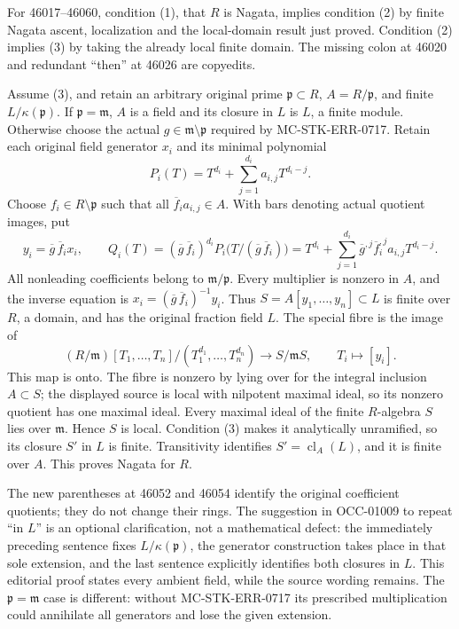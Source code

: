 For 46017--46060, condition (1), that \(R\) is Nagata, implies condition (2) by finite Nagata ascent, localization and the local-domain result just proved. Condition (2) implies (3) by taking the already local finite domain. The missing colon at 46020 and redundant ``then'' at 46026 are copyedits.

Assume (3), and retain an arbitrary original prime \(\mathfrak p\subset R\), \(A=R/\mathfrak p\), and finite \(L/\kappa(\mathfrak p)\). If \(\mathfrak p=\mathfrak m\), \(A\) is a field and its closure in \(L\) is \(L\), a finite module. Otherwise choose the actual \(g\in\mathfrak m\setminus\mathfrak p\) required by MC-\AlgebraIdentifierBreak{}STK-\AlgebraIdentifierBreak{}ERR-\AlgebraIdentifierBreak{}0717. Retain each original field generator \(x_i\) and its minimal polynomial \[
 P_i(T)=T^{d_i}+\sum_{j=1}^{d_i}a_{i,j}T^{d_i-j}.
\] Choose \(f_i\in R\setminus\mathfrak p\) such that all \(\overline f_i a_{i,j}\in A\). With bars denoting actual quotient images, put \[
 y_i=\overline g\,\overline f_i x_i,\qquad
 Q_i(T)=(\overline g\,\overline f_i)^{d_i}
 P_i\bigl(T/(\overline g\,\overline f_i)\bigr)
 =T^{d_i}+\sum_{j=1}^{d_i}
   \overline g^{,j}\overline f_i^{,j}a_{i,j}T^{d_i-j}.
\] All nonleading coefficients belong to \(\mathfrak m/\mathfrak p\). Every multiplier is nonzero in \(A\), and the inverse equation is \(x_i=(\overline g\,\overline f_i)^{-1}y_i\). Thus \(S=A[y_1,\ldots,y_n]\subset L\) is finite over \(R\), a domain, and has the original fraction field \(L\). The special fibre is the image of \[
 (R/\mathfrak m)[T_1,\ldots,T_n]/(T_1^{d_1},\ldots,T_n^{d_n})
 \longrightarrow S/\mathfrak mS,
 \qquad T_i\longmapsto[y_i].
\] This map is onto. The fibre is nonzero by lying over for the integral inclusion \(A\subset S\); the displayed source is local with nilpotent maximal ideal, so its nonzero quotient has one maximal ideal. Every maximal ideal of the finite \(R\)-algebra \(S\) lies over \(\mathfrak m\). Hence \(S\) is local. Condition (3) makes it analytically unramified, so its closure \(S'\) in \(L\) is finite. Transitivity identifies \(S'=\operatorname{cl}_A(L)\), and it is finite over \(A\). This proves Nagata for \(R\).

The new parentheses at 46052 and 46054 identify the original coefficient quotients; they do not change their rings. The suggestion in OCC-01009 to repeat ``in \(L\)'' is an optional clarification, not a mathematical defect: the immediately preceding sentence fixes \(L/\kappa(\mathfrak p)\), the generator construction takes place in that sole extension, and the last sentence explicitly identifies both closures in \(L\). This editorial proof states every ambient field, while the source wording remains. The \(\mathfrak p=\mathfrak m\) case is different: without MC-\AlgebraIdentifierBreak{}STK-\AlgebraIdentifierBreak{}ERR-\AlgebraIdentifierBreak{}0717 its prescribed multiplication could annihilate all generators and lose the given extension.

